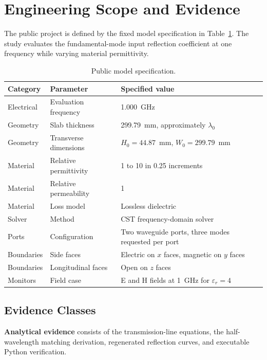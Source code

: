 \section{Engineering Scope and Evidence}
\label{sec:scope-and-evidence}

The public project is defined by the fixed model specification in
Table~\ref{tab:model-specification}. The study evaluates the fundamental-mode input
reflection coefficient at one frequency while varying material permittivity.

\begin{table}[H]
\centering
\caption{Public model specification.}
\label{tab:model-specification}
\begin{tabularx}{\textwidth}{@{}p{}p{}X@{}}
\toprule
\textbf{Category} & \textbf{Parameter} & \textbf{Specified value} \\
\midrule
Electrical & Evaluation frequency & 1.000~GHz \\
Geometry & Slab thickness & 299.79~mm, approximately $\lambda_0$ \\
Geometry & Transverse dimensions & $H_0=44.87$~mm, $W_0=299.79$~mm \\
Material & Relative permittivity & 1 to 10 in 0.25 increments \\
Material & Relative permeability & 1 \\
Material & Loss model & Lossless dielectric \\
Solver & Method & CST frequency-domain solver \\
Ports & Configuration & Two waveguide ports, three modes requested per port \\
Boundaries & Side faces & Electric on $x$ faces, magnetic on $y$ faces \\
Boundaries & Longitudinal faces & Open on $z$ faces \\
Monitors & Field case & E and H fields at 1~GHz for $\varepsilon_r=4$ \\
\bottomrule
\end{tabularx}
\end{table}

\subsection{Evidence Classes}

\textbf{Analytical evidence} consists of the transmission-line equations, the
half-wavelength matching derivation, regenerated reflection curves, and executable
Python verification.

